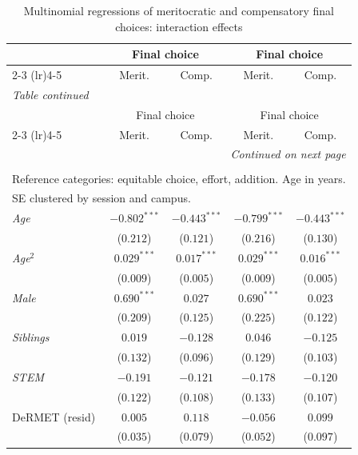 \begin{footnotesize}
\begin{longtable}{l cc cc}
\caption{Multinomial regressions of meritocratic and compensatory final choices: interaction effects} \label{table-b9-final} \\
\toprule
 & \multicolumn{2}{c}{Final choice} & \multicolumn{2}{c}{Final choice} \\
\cmidrule(lr){2-3} \cmidrule(lr){4-5}
 & Merit. & Comp. & Merit. & Comp. \\
\midrule
\endfirsthead
\multicolumn{5}{l}{\textit{Table \thetable{} continued}} \\
\toprule
 & \multicolumn{2}{c}{Final choice} & \multicolumn{2}{c}{Final choice} \\
\cmidrule(lr){2-3} \cmidrule(lr){4-5}
 & Merit. & Comp. & Merit. & Comp. \\
\midrule
\endhead
\midrule
\multicolumn{5}{r}{\textit{Continued on next page}} \\
\endfoot
\bottomrule
\multicolumn{5}{l}{\footnotesize $^{***}p<0.01$; $^{**}p<0.05$; $^{*}p<0.1$.} \\
\multicolumn{5}{l}{\footnotesize Reference categories: equitable choice, effort, addition. Age in years.} \\
\multicolumn{5}{l}{\footnotesize SE clustered by session and campus.} \\
\endlastfoot
\textit{Age} & $-0.802^{***}$ & $-0.443^{***}$ & $-0.799^{***}$ & $-0.443^{***}$ \\
    & ($0.212$) & ($0.121$) & ($0.216$) & ($0.130$) \\
\textit{Age}$^2$ & $0.029^{***}$ & $0.017^{***}$ & $0.029^{***}$ & $0.016^{***}$ \\
    & ($0.009$) & ($0.005$) & ($0.009$) & ($0.005$) \\
\textit{Male} & $0.690^{***}$ & $0.027$ & $0.690^{***}$ & $0.023$ \\
    & ($0.209$) & ($0.125$) & ($0.225$) & ($0.122$) \\
\textit{Siblings} & $0.019$ & $-0.128$ & $0.046$ & $-0.125$ \\
    & ($0.132$) & ($0.096$) & ($0.129$) & ($0.103$) \\
\textit{STEM} & $-0.191$ & $-0.121$ & $-0.178$ & $-0.120$ \\
    & ($0.122$) & ($0.108$) & ($0.133$) & ($0.107$) \\
DeRMET (resid) & $0.005$ & $0.118$ & $-0.056$ & $0.099$ \\
    & ($0.035$) & ($0.079$) & ($0.052$) & ($0.097$) \\

\end{longtable}
\end{footnotesize}
